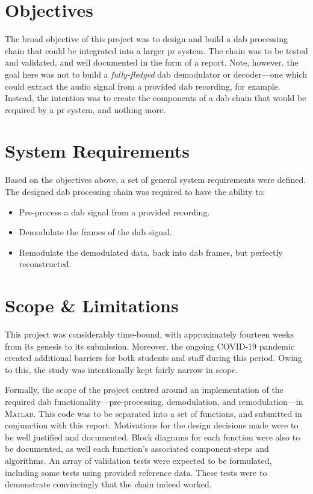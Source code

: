 \documentclass[class=report,11pt,crop=false]{standalone}
\begin{document}
\section{Objectives}
The broad objective of this project was to design and build a \gls{dab} processing chain that could be integrated into a larger \gls{pr} system. The chain was to be tested and validated, and well documented in the form of a report. Note, however, the goal here was not to build a \emph{fully-fledged} \gls{dab} demodulator or decoder---one which could extract the audio signal from a provided \gls{dab} recording, for example. Instead, the intention was to create the components of a \gls{dab} chain that would be required by a \gls{pr} system, and nothing more.

\section{System Requirements}
Based on the objectives above, a set of general system requirements were defined. The designed \gls{dab} processing chain was required to have the ability to:
\begin{itemize}
    \item Pre-process a \gls{dab} signal from a provided recording.
    \item Demodulate the frames of the \gls{dab} signal.
    \item Remodulate the demodulated data, back into \gls{dab} frames, but perfectly reconstructed.
\end{itemize}

\section{Scope \& Limitations}
This project was considerably time-bound, with approximately fourteen weeks from its genesis to its submission. Moreover, the ongoing COVID-19 pandemic created additional barriers for both students and staff during this period. Owing to this, the study was intentionally kept fairly narrow in scope.

Formally, the scope of the project centred around an implementation of the required \gls{dab} functionality---pre-processing, demodulation, and remodulation---in \textsc{Matlab}. This code was to be separated into a set of functions, and submitted in conjunction with this report. Motivations for the design decisions made were to be well justified and documented. Block diagrams for each function were also to be documented, as well each function's associated component-steps and algorithms. An array of validation tests were expected to be formulated, including some tests using provided reference data. These tests were to demonstrate convincingly that the chain indeed worked.
\end{document}
